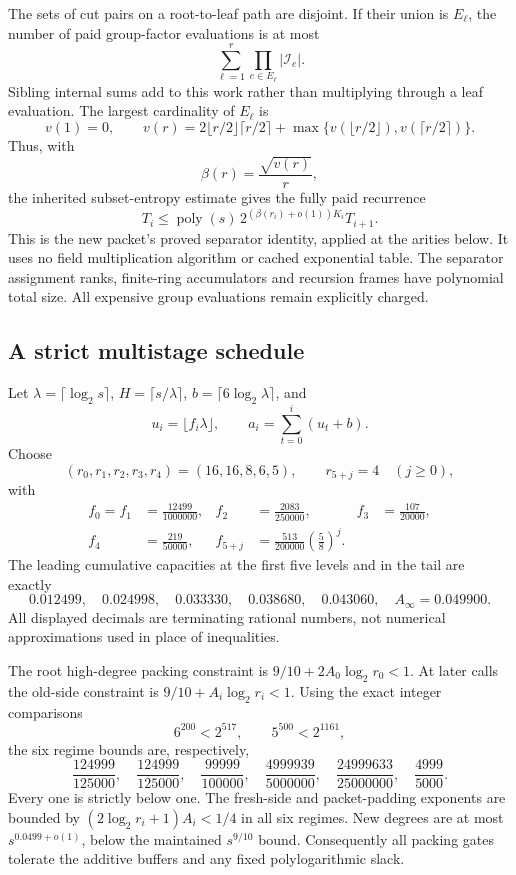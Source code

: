 The sets of cut pairs on a root-to-leaf path are disjoint. If their union
is $E_\ell$, the number of paid group-factor evaluations is at most
\[
 \sum_{\ell=1}^r\prod_{e\in E_\ell}|\mathcal I_e|.
\]
Sibling internal sums add to this work rather than multiplying through a
leaf evaluation. The largest cardinality of $E_\ell$ is
\[
 v(1)=0,\qquad
 v(r)=2\lfloor r/2\rfloor\lceil r/2\rceil+
       \max\{v(\lfloor r/2\rfloor),v(\lceil r/2\rceil)\}.
\]
Thus, with
\[
 \beta(r)=\frac{\sqrt{v(r)}}r,
\]
the inherited subset-entropy estimate gives the fully paid recurrence
\begin{equation}\label{eq:streamed-new-recurrence}
 T_i\le\operatorname{poly}(s)\,
       2^{(\beta(r_i)+o(1))K_i}T_{i+1}.
\end{equation}
This is the new packet's proved separator identity, applied at the arities
below. It uses no field multiplication algorithm or cached exponential table.
The separator assignment ranks, finite-ring accumulators and recursion
frames have polynomial total size. All expensive group evaluations remain
explicitly charged.

\subsection{A strict multistage schedule}

Let $\lambda=\lceil\log_2s\rceil$, $H=\lceil s/\lambda\rceil$,
$b=\lceil6\log_2\lambda\rceil$, and
\[
 u_i=\lfloor f_i\lambda\rfloor,\qquad
 a_i=\sum_{t=0}^i(u_t+b).
\]
Choose
\[
 (r_0,r_1,r_2,r_3,r_4)=(16,16,8,6,5),\qquad
 r_{5+j}=4\quad(j\ge0),
\]
with
\begin{align*}
 f_0=f_1&=\frac{12499}{1000000},&
 f_2&=\frac{2083}{250000},&
 f_3&=\frac{107}{20000},\\
 f_4&=\frac{219}{50000},&
 f_{5+j}&=\frac{513}{200000}\left(\frac58\right)^j.
\end{align*}
The leading cumulative capacities at the first five levels and in the tail
are exactly
\[
 0.012499,\quad0.024998,\quad0.033330,\quad
 0.038680,\quad0.043060,\quad A_\infty=0.049900.
\]
All displayed decimals are terminating rational numbers, not numerical
approximations used in place of inequalities.

The root high-degree packing constraint is
$9/10+2A_0\log_2r_0<1$. At later calls the old-side constraint is
$9/10+A_i\log_2r_i<1$. Using the exact integer comparisons
\[
 6^{200}<2^{517},\qquad5^{500}<2^{1161},
\]
the six regime bounds are, respectively,
\[
 \frac{124999}{125000},\quad
 \frac{124999}{125000},\quad
 \frac{99999}{100000},\quad
 \frac{4999939}{5000000},\quad
 \frac{24999633}{25000000},\quad
 \frac{4999}{5000}.
\]
Every one is strictly below one. The fresh-side and packet-padding
exponents are bounded by $(2\log_2r_i+1)A_i<1/4$ in all six regimes.
New degrees are at most $s^{0.0499+o(1)}$, below the maintained
$s^{9/10}$ bound. Consequently all packing gates tolerate the additive
buffers and any fixed polylogarithmic slack.

